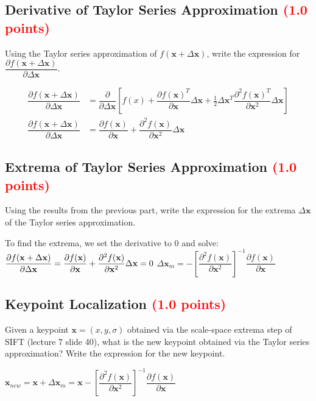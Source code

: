 \documentclass[answers]{exam}
\newcommand{\mypoints}[1]{\textcolor{red}{(#1 points)}}
\begin{document}
\subsection{Derivative of Taylor Series Approximation \mypoints{1.0}}
Using the Taylor series approximation of $f(\mathbf{x} + \Delta \mathbf{x})$, write the expression for $\dfrac{\partial f(\mathbf{x} + \Delta \mathbf{x})}{\partial \Delta \mathbf{x}}$.
\begin{solution}
\begin{align}
\dfrac{\partial f(\mathbf{x} + \Delta \mathbf{x})}{\partial \Delta \mathbf{x}}&=\dfrac{\partial }{\partial \Delta \mathbf{x}}
\left[
f(x)+\dfrac{\partial f(\mathbf{x})^T}{\partial \mathbf{x}}\Delta \mathbf{x}+\frac{1}{2}\Delta \mathbf{x}^T\dfrac{\partial^2 f(\mathbf{x})^T}{\partial \mathbf{x}^2}\Delta \mathbf{x}\right]\\
\dfrac{\partial f(\mathbf{x} + \Delta \mathbf{x})}{\partial \Delta \mathbf{x}}&=
\dfrac{\partial f(\mathbf{x})}{\partial \mathbf{x}} + \dfrac{\partial^2 f(\mathbf{x})}{\partial \mathbf{x}^2}\Delta \mathbf{x}
\end{align}
\end{solution}

\subsection{Extrema of Taylor Series Approximation \mypoints{1.0}}
Using the results from the previous part, write the expression for the extrema $\Delta \mathbf{x}$ of the Taylor series approximation.
\begin{solution}
To find the extrema, we set the derivative to $0$ and solve:
$\dfrac{\partial f(\mathbf{x} + \Delta \mathbf{x})}{\partial \Delta \mathbf{x}}=\dfrac{\partial f(\mathbf{x})}{\partial \mathbf{x}} + \dfrac{\partial^2 f(\mathbf{x})}{\partial \mathbf{x}^2}\Delta \mathbf{x}=0\\$
$
\Delta \mathbf{x}_m=-\left[\dfrac{\partial^2 f(\mathbf{x})}{\partial \mathbf{x}^2}\right]^{-1}\dfrac{\partial f(\mathbf{x})}{\partial \mathbf{x}}
$
\end{solution}

\subsection{Keypoint Localization \mypoints{1.0}}
\label{keypoint_loc}
Given a keypoint $\mathbf{x} = (x, y, \sigma)$ obtained via the scale-space extrema step of SIFT (lecture 7 slide 40), what is the new keypoint obtained via the Taylor series approximation? Write the expression for the new keypoint.
\begin{solution}
$
\mathbf{x}_{new}= \mathbf{x} + \Delta \mathbf{x}_m=\mathbf{x}-\left[\dfrac{\partial^2 f(\mathbf{x})}{\partial \mathbf{x}^2}\right]^{-1}\dfrac{\partial f(\mathbf{x})}{\partial \mathbf{x}}
$
\end{solution}
\end{document}
